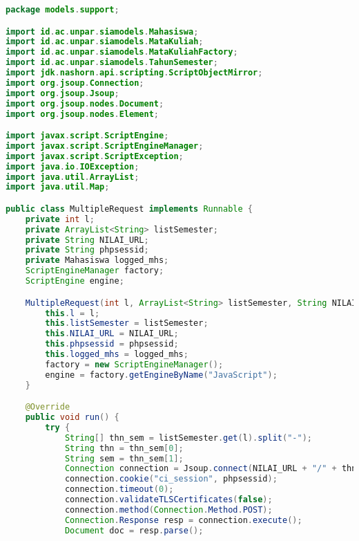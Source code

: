 \singlespacing
\begin{lstlisting}[language=Java,basicstyle=\tiny,caption=MultipleRequest.java]
package models.support;

import id.ac.unpar.siamodels.Mahasiswa;
import id.ac.unpar.siamodels.MataKuliah;
import id.ac.unpar.siamodels.MataKuliahFactory;
import id.ac.unpar.siamodels.TahunSemester;
import jdk.nashorn.api.scripting.ScriptObjectMirror;
import org.jsoup.Connection;
import org.jsoup.Jsoup;
import org.jsoup.nodes.Document;
import org.jsoup.nodes.Element;

import javax.script.ScriptEngine;
import javax.script.ScriptEngineManager;
import javax.script.ScriptException;
import java.io.IOException;
import java.util.ArrayList;
import java.util.Map;

public class MultipleRequest implements Runnable {
    private int l;
    private ArrayList<String> listSemester;
    private String NILAI_URL;
    private String phpsessid;
    private Mahasiswa logged_mhs;
    ScriptEngineManager factory;
    ScriptEngine engine;

    MultipleRequest(int l, ArrayList<String> listSemester, String NILAI_URL, String phpsessid, Mahasiswa logged_mhs){
        this.l = l;
        this.listSemester = listSemester;
        this.NILAI_URL = NILAI_URL;
        this.phpsessid = phpsessid;
        this.logged_mhs = logged_mhs;
        factory = new ScriptEngineManager();
        engine = factory.getEngineByName("JavaScript");
    }

    @Override
    public void run() {
        try {
            String[] thn_sem = listSemester.get(l).split("-");
            String thn = thn_sem[0];
            String sem = thn_sem[1];
            Connection connection = Jsoup.connect(NILAI_URL + "/" + thn + "/" + sem);
            connection.cookie("ci_session", phpsessid);
            connection.timeout(0);
            connection.validateTLSCertificates(false);
            connection.method(Connection.Method.POST);
            Connection.Response resp = connection.execute();
            Document doc = resp.parse();


\end{lstlisting}

